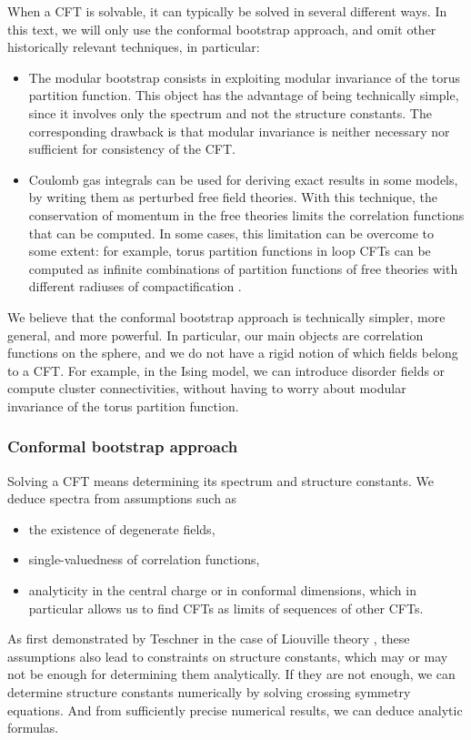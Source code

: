 \documentclass[12pt, a4paper]{article}
\begin{document}
When a CFT is solvable, it can typically be solved in several different ways. In this text, we will only use the conformal bootstrap approach, and omit other historically relevant techniques, in particular:
\begin{itemize}
 \item The modular bootstrap consists in exploiting modular invariance of the torus partition function. This object has the advantage of being technically simple, since it involves only the spectrum and not the structure constants. The corresponding drawback is that modular invariance is neither necessary nor sufficient for consistency of the CFT.
 \item Coulomb gas integrals can be used for deriving exact results in some models, by writing them as perturbed free field theories. With this technique, the conservation of momentum in the free theories limits the correlation functions that can be computed. In some cases, this limitation can be overcome to some extent: for example, torus partition functions in loop CFTs can be computed as infinite combinations of partition functions of free theories with different radiuses of compactification \cite{fsz87}.
\end{itemize}
We believe that the conformal bootstrap approach is technically simpler, more general, and more powerful. In particular, our main objects are correlation functions on the sphere, and we do not have a rigid notion of which fields belong to a CFT. For example, in the Ising model, we can introduce disorder fields or compute cluster connectivities, without having to worry about modular invariance of the torus partition function.

\subsubsection*{Conformal bootstrap approach}

Solving a CFT means determining its spectrum and structure constants. We deduce spectra from assumptions such as
\begin{itemize}
 \item the existence of degenerate fields,
 \item single-valuedness of correlation functions,
 \item analyticity in the central charge or in conformal dimensions, which in particular allows us to find CFTs as limits of sequences of other CFTs. 
\end{itemize}
As first demonstrated by Teschner in the case of Liouville theory \cite{tes95},
these assumptions also lead to constraints on structure constants, which may or may not be enough for determining them analytically. If they are not enough, we can determine structure constants numerically by solving crossing symmetry equations. And from sufficiently precise numerical results, we can deduce analytic formulas.
\end{document}
